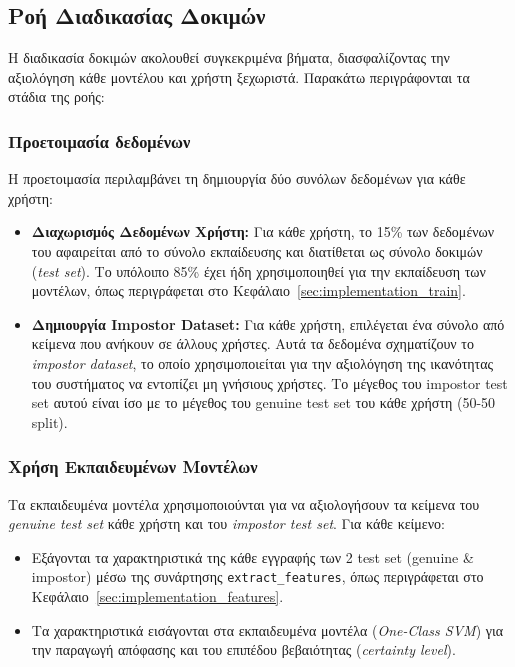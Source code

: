 \subsection{Ροή Διαδικασίας Δοκιμών}
Η διαδικασία δοκιμών ακολουθεί συγκεκριμένα βήματα, διασφαλίζοντας την αξιολόγηση κάθε μοντέλου και χρήστη ξεχωριστά. Παρακάτω περιγράφονται τα στάδια της ροής:

\subsubsection{Προετοιμασία δεδομένων} 
Η προετοιμασία περιλαμβάνει τη δημιουργία δύο συνόλων δεδομένων για κάθε χρήστη:
\begin{itemize}
    \item \textbf{Διαχωρισμός Δεδομένων Χρήστη:} Για κάθε χρήστη, το 15\% των δεδομένων του αφαιρείται από το σύνολο εκπαίδευσης και διατίθεται ως σύνολο δοκιμών (\emph{test set}). Το υπόλοιπο 85\% έχει ήδη χρησιμοποιηθεί για την εκπαίδευση των μοντέλων, όπως περιγράφεται στο Κεφάλαιο~\ref{sec:implementation_train}.
    \item \textbf{Δημιουργία Impostor Dataset:} Για κάθε χρήστη, επιλέγεται ένα σύνολο από κείμενα που ανήκουν σε άλλους χρήστες. Αυτά τα δεδομένα σχηματίζουν το \emph{impostor dataset}, το οποίο χρησιμοποιείται για την αξιολόγηση της ικανότητας του συστήματος να εντοπίζει μη γνήσιους χρήστες. Το μέγεθος του impostor test set αυτού είναι ίσο με το μέγεθος του genuine test set του κάθε χρήστη (50-50 split).
\end{itemize}

\subsubsection{Χρήση Εκπαιδευμένων Μοντέλων}
Τα εκπαιδευμένα μοντέλα χρησιμοποιούνται για να αξιολογήσουν τα κείμενα του \emph{genuine test set} κάθε χρήστη και του \emph{impostor test set}. Για κάθε κείμενο:
\begin{itemize}
    \item Εξάγονται τα χαρακτηριστικά της κάθε εγγραφής των 2 test set (genuine \& impostor) μέσω της συνάρτησης \texttt{extract\_features}, όπως περιγράφεται στο Κεφάλαιο~\ref{sec:implementation_features}.
    \item Τα χαρακτηριστικά εισάγονται στα εκπαιδευμένα μοντέλα (\emph{One-Class SVM}) για την παραγωγή απόφασης και του επιπέδου βεβαιότητας (\emph{certainty level}).
\end{itemize}

